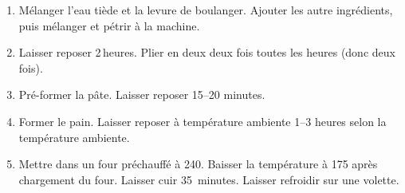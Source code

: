 
\begin{ingredients}
\end{ingredients}


\begin{recipe}
  \begin{enumerate}

  \item Mélanger l'eau tiède et la levure de boulanger.  Ajouter les
    autre ingrédients, puis mélanger et pétrir à la machine.
    
  \item Laisser reposer 2$\,$\fracH heures.  Plier en deux deux fois toutes
    les heures (donc deux fois).
    
  \item Pré-former la pâte.  Laisser reposer 15--20 minutes.
    
  \item Former le pain.  Laisser reposer à température ambiente 1--3
    heures selon la température ambiente.
    
  \item Mettre dans un four préchauffé à 240\degreeC.  Baisser la
    température à 175\degreeC{} après chargement du four.  Laisser cuir
    35~minutes.  Laisser refroidir sur une volette.

  \end{enumerate}
\end{recipe}

